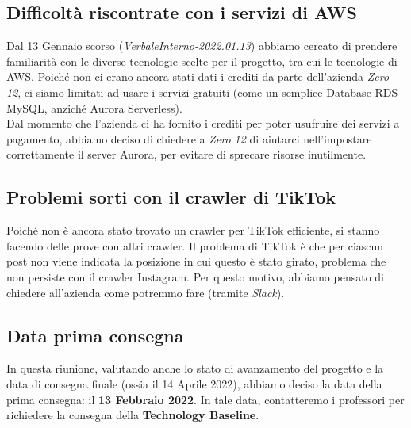 \subsection{Difficoltà riscontrate con i servizi di AWS}
Dal 13 Gennaio scorso (\textit{VerbaleInterno-2022.01.13}) abbiamo cercato di prendere familiarità con le diverse tecnologie scelte per il progetto, tra cui le tecnologie di AWS. Poiché non ci erano ancora stati dati i crediti da parte dell'azienda \textit{Zero 12}, ci siamo limitati ad usare i servizi gratuiti (come un semplice Database RDS MySQL, anziché Aurora Serverless). \\
Dal momento che l'azienda ci ha fornito i crediti per poter usufruire dei servizi a pagamento, abbiamo deciso di chiedere a \textit{Zero 12} di aiutarci nell'impostare correttamente il server Aurora, per evitare di sprecare risorse inutilmente.

\subsection{Problemi sorti con il crawler di TikTok}

Poiché non è ancora stato trovato un crawler per TikTok efficiente, si stanno facendo delle prove con altri crawler. Il problema di TikTok è che per ciascun post non viene indicata la posizione in cui questo è stato girato, problema che non persiste con il crawler Instagram. Per questo motivo, abbiamo pensato di chiedere all'azienda come potremmo fare (tramite \textit{Slack}).

\subsection{Data prima consegna}

In questa riunione, valutando anche lo stato di avanzamento del progetto e la data di consegna finale (ossia il 14 Aprile 2022), abbiamo deciso la data della prima consegna: il \textbf{13 Febbraio 2022}. In tale data, contatteremo i professori per richiedere la consegna della \textbf{Technology Baseline}.
